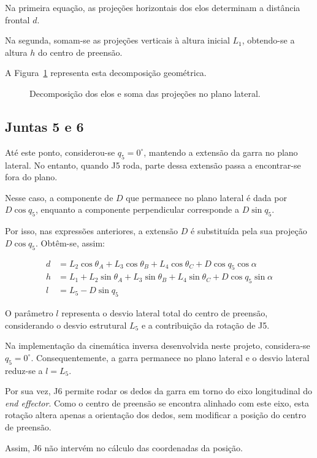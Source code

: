 Na primeira equação, as projeções horizontais dos elos determinam a distância frontal $d$.

Na segunda, somam-se as projeções verticais à altura inicial $L_1$, obtendo-se a altura $h$ do centro de preensão.

A Figura~\ref{fig:soma_projecoes} representa esta decomposição geométrica.

\begin{figure}[htbp]
    \centering
    \resizebox{0.6\textwidth}{!}{}
    \caption{Decomposição dos elos e soma das projeções no plano lateral.}
    \label{fig:soma_projecoes}
\end{figure}

\subsection{Juntas 5 e 6}

Até este ponto, considerou-se $q_5=0^\circ$, mantendo a extensão da garra no plano lateral. No entanto, quando J5 roda, parte dessa extensão passa a encontrar-se fora do plano.

Nesse caso, a componente de $D$ que permanece no plano lateral é dada por $D\cos q_5$, enquanto a componente perpendicular corresponde a $D\sin q_5$.

Por isso, nas expressões anteriores, a extensão $D$ é substituída pela sua projeção $D\cos q_5$. Obtêm-se, assim:

\begin{align}
    d &= L_2\cos\theta_A+
    L_3\cos\theta_B+
    L_4\cos\theta_C+
    D\cos q_5\cos\alpha
    \label{eq:d_q5}\\
    h &= L_1+
    L_2\sin\theta_A+
    L_3\sin\theta_B+
    L_4\sin\theta_C+
    D\cos q_5\sin\alpha
    \label{eq:h_q5}\\
    l &= L_5-D\sin q_5
    \label{eq:q5}
\end{align}

O parâmetro $l$ representa o desvio lateral total do centro de preensão, considerando o desvio estrutural $L_5$ e a contribuição da rotação de J5.

Na implementação da cinemática inversa desenvolvida neste projeto, considera-se $q_5=0^\circ$. Consequentemente, a garra permanece no plano lateral e o desvio lateral reduz-se a $l=L_5$.

Por sua vez, J6 permite rodar os dedos da garra em torno do eixo longitudinal do \textit{end effector}. Como o centro de preensão se encontra alinhado com este eixo, esta rotação altera apenas a orientação dos dedos, sem modificar a posição do centro de preensão.

Assim, J6 não intervém no cálculo das coordenadas da posição.

